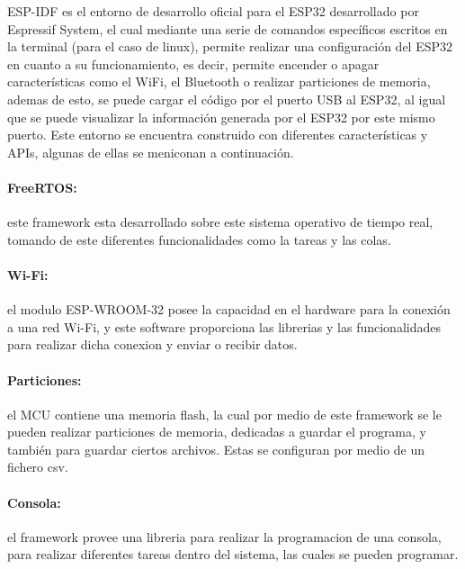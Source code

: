 ESP-IDF es el entorno de desarrollo oficial para el ESP32 desarrollado por Espressif System, el cual mediante una serie de comandos específicos escritos en la terminal (para el caso de linux), permite realizar una configuración del ESP32 en cuanto a su funcionamiento, es decir, permite encender o apagar características como el WiFi, el Bluetooth o realizar particiones de memoria, ademas de esto, se puede cargar el código por el puerto USB al ESP32, al igual que se puede visualizar la información generada por el ESP32 por este mismo puerto. Este entorno se encuentra construido con diferentes características y APIs, algunas de ellas se meniconan a continuación. \cite{ES}\\

\paragraph{FreeRTOS:}este framework esta desarrollado sobre este sistema operativo de tiempo real, tomando de este diferentes funcionalidades como la tareas y las colas.


\paragraph{Wi-Fi:}el modulo ESP-WROOM-32 posee la capacidad en el hardware para la conexión a una red Wi-Fi, y este software proporciona las librerias y las funcionalidades para realizar dicha conexion y enviar o recibir datos.


\paragraph{Particiones:}el MCU contiene una memoria flash, la cual por medio de este framework se le pueden realizar particiones de memoria, dedicadas a guardar el programa, y también para guardar ciertos archivos. Estas se configuran por medio de un fichero csv.


\paragraph{Consola:}el framework provee una libreria para realizar la programacion de una consola, para realizar diferentes tareas dentro del sistema, las cuales se pueden programar.

